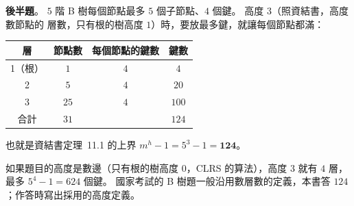 \begin{pastsoln}
\textbf{後半題}。 $5$ 階 B 樹每個節點最多 $5$ 個子節點、$4$ 個鍵。 高度 $3$（照資結書，高度數節點的
層數，只有根的樹高度 $1$）時，要放最多鍵，就讓每個節點都滿：
\begin{center}
\small
\begin{tabular}{cccc}
\toprule
層 & 節點數 & 每個節點的鍵數 & 鍵數 \\
\midrule
1（根） & $1$ & $4$ & $4$ \\
2 & $5$ & $4$ & $20$ \\
3 & $25$ & $4$ & $100$ \\
\midrule
合計 & $31$ & & $124$ \\
\bottomrule
\end{tabular}
\end{center}
也就是資結書定理~11.1 的上界 $m^h - 1 = 5^3 - 1 = \mathbf{124}$。

如果題目的高度是數邊（只有根的樹高度 $0$，CLRS 的算法），高度 $3$ 就有 $4$ 層，最多
$5^4 - 1 = 624$ 個鍵。 國家考試的 B 樹題一般沿用數層數的定義，本書答 $124$；作答時寫出採用的高度定義。
\end{pastsoln}
